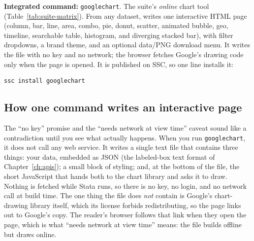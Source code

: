 \begin{kaobox}[frametitle=Package Integration: \texttt{googlechart}]
\textbf{Integrated command:} \texttt{googlechart}. The suite's \emph{online} chart tool (Table~\ref{tab:suite-matrix}). From any dataset, writes one interactive HTML page (column, bar, line, area, combo, pie, donut, scatter, animated bubble, geo, timeline, searchable table, histogram, and diverging stacked bar), with filter dropdowns, a brand theme, and an optional data/PNG download menu. It writes the file with no key and no network; the browser fetches Google's drawing code only when the page is opened. It is published on SSC, so one line installs it:
\par
{\footnotesize
\begin{verbatim}
ssc install googlechart
\end{verbatim}
}
\end{kaobox}

\subsection{How one command writes an interactive page}\label{sec:gc-how}
The \enquote{no key} promise and the \enquote{needs network at view time} caveat sound like a contradiction until you see what actually happens. When you run \texttt{googlechart}, it does not call any web service. It writes a single text file that contains three things: your data, embedded as JSON (the labeled-box text format of Chapter~\ref{ch:apis}); a small block of styling; and, at the bottom of the file, the short JavaScript that hands both to the chart library and asks it to draw. Nothing is fetched while Stata runs, so there is no key, no login, and no network call at build time. The one thing the file does \emph{not} contain is Google's chart-drawing library itself, which its license forbids redistributing, so the page links out to Google's copy. The reader's browser follows that link when they open the page, which is what \enquote{needs network at view time} means: the file builds offline but draws online.

